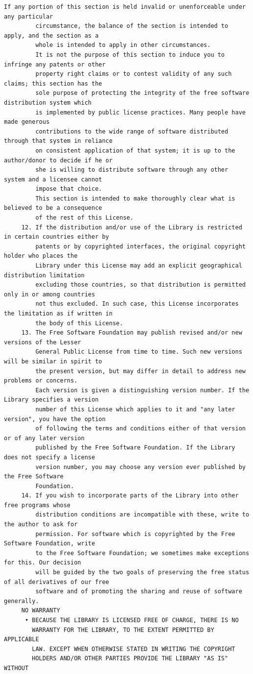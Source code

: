 \begin{lstlisting}[basicstyle=\ttfamily\footnotesize,breaklines=true]
         If any portion of this section is held invalid or unenforceable under any particular
         circumstance, the balance of the section is intended to apply, and the section as a
         whole is intended to apply in other circumstances.
         It is not the purpose of this section to induce you to infringe any patents or other
         property right claims or to contest validity of any such claims; this section has the
         sole purpose of protecting the integrity of the free software distribution system which
         is implemented by public license practices. Many people have made generous
         contributions to the wide range of software distributed through that system in reliance
         on consistent application of that system; it is up to the author/donor to decide if he or
         she is willing to distribute software through any other system and a licensee cannot
         impose that choice.
         This section is intended to make thoroughly clear what is believed to be a consequence
         of the rest of this License.
     12. If the distribution and/or use of the Library is restricted in certain countries either by
         patents or by copyrighted interfaces, the original copyright holder who places the
         Library under this License may add an explicit geographical distribution limitation
         excluding those countries, so that distribution is permitted only in or among countries
         not thus excluded. In such case, this License incorporates the limitation as if written in
         the body of this License.
     13. The Free Software Foundation may publish revised and/or new versions of the Lesser
         General Public License from time to time. Such new versions will be similar in spirit to
         the present version, but may differ in detail to address new problems or concerns.
         Each version is given a distinguishing version number. If the Library specifies a version
         number of this License which applies to it and "any later version", you have the option
         of following the terms and conditions either of that version or of any later version
         published by the Free Software Foundation. If the Library does not specify a license
         version number, you may choose any version ever published by the Free Software
         Foundation.
     14. If you wish to incorporate parts of the Library into other free programs whose
         distribution conditions are incompatible with these, write to the author to ask for
         permission. For software which is copyrighted by the Free Software Foundation, write
         to the Free Software Foundation; we sometimes make exceptions for this. Our decision
         will be guided by the two goals of preserving the free status of all derivatives of our free
         software and of promoting the sharing and reuse of software generally.
     NO WARRANTY
      • BECAUSE THE LIBRARY IS LICENSED FREE OF CHARGE, THERE IS NO
        WARRANTY FOR THE LIBRARY, TO THE EXTENT PERMITTED BY APPLICABLE
        LAW. EXCEPT WHEN OTHERWISE STATED IN WRITING THE COPYRIGHT
        HOLDERS AND/OR OTHER PARTIES PROVIDE THE LIBRARY "AS IS" WITHOUT





\end{lstlisting}
